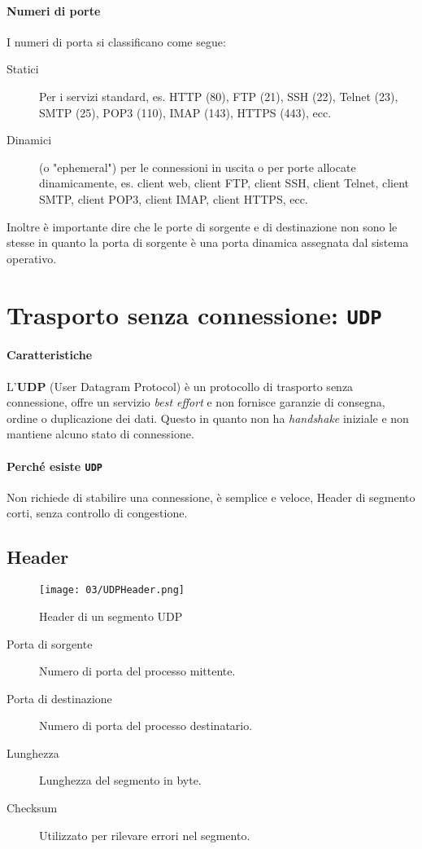         \paragraph{Numeri di porte}
            I numeri di porta si classificano come segue:
            \begin{description}
                \item[Statici] Per i servizi standard, es. HTTP (80), FTP (21), SSH (22), Telnet (23), SMTP (25), POP3 (110), IMAP (143), HTTPS (443), ecc.
                \item[Dinamici] (o "ephemeral") per le connessioni in uscita o per porte allocate dinamicamente, es. client web, client FTP, client SSH, client Telnet, client SMTP, client POP3, client IMAP, client HTTPS, ecc.
            \end{description}
            Inoltre è importante dire che le porte di sorgente e di destinazione non sono le stesse in quanto la porta di sorgente è una porta dinamica assegnata dal sistema operativo.
\section{Trasporto senza connessione: \texttt{UDP}}
    \paragraph{Caratteristiche} L'\textbf{UDP} (User Datagram Protocol) è un protocollo di trasporto senza connessione, offre un servizio \textit{best effort} e non fornisce garanzie di consegna, ordine o duplicazione dei dati. Questo in quanto non ha \textit{handshake} iniziale e non mantiene alcuno stato di connessione. 
    \paragraph{Perché esiste \texttt{UDP}} Non richiede di stabilire una connessione, è semplice e veloce, Header di segmento corti, senza controllo di congestione.
    \subsection{Header}
        \begin{figure}[H]
            \centering
            \texttt{[image: 03/UDPHeader.png]}
            \caption{Header di un segmento UDP}
        \end{figure}
        \begin{description}
            \item[Porta di sorgente] Numero di porta del processo mittente.
            \item[Porta di destinazione] Numero di porta del processo destinatario.
            \item[Lunghezza] Lunghezza del segmento in byte.
            \item[Checksum] Utilizzato per rilevare errori nel segmento.
        \end{description}
